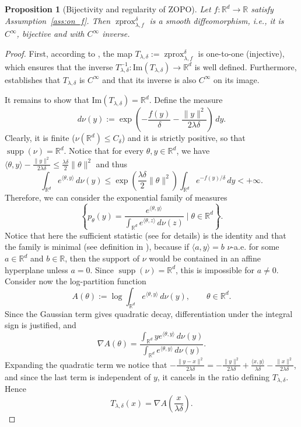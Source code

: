 \documentclass{article}
\newtheorem{proposition}{Proposition}
\newcommand{\R}{\mathbb{R}}
\newcommand{\zprox}{\ensuremath{\operatorname{zprox}}}
\begin{document}
\begin{proposition}[Bijectivity and regularity of ZOPO]\label{prop:zopo_surjective}
Let \(f:\mathbb{R}^d\to\mathbb{R}\) satisfy Assumption~\ref{ass:on_f}. Then $\zprox^{\delta}_{\lambda, f}$ is a smooth diffeomorphism, i.e., it is $C^\infty$, bijective and with $C^\infty$ inverse.
\end{proposition}
\begin{proof}  First, according to \cite[Corollary 1 (1)]{Gribonval2013}, the map $T_{\lambda,\delta}:= \operatorname{zprox}_{\lambda,f}^\delta$ is one-to-one (injective), which ensures that the inverse $T_{\lambda,\delta}^{-1}: \mathrm{Im}(T_{\lambda,\delta}) \to \mathbb{R}^d$ is well defined. Furthermore, \cite[Corollary 1 (2)]{Gribonval2013} establishes that $T_{\lambda,\delta}$ is $C^\infty$ and that its inverse is also $C^\infty$ on its image. 

It remains to show that $\mathrm{Im}(T_{\lambda,\delta})= \R^d$. Define the measure
\[
    d\nu(y)
    :=
    \exp\left(
        -\frac{f(y)}{\delta}
        -
        \frac{\|y\|^2}{2\lambda\delta}
    \right)\,dy.
\]
Clearly, it is finite ($\nu(\mathbb{R}^d)\leq C_\delta$) and it is strictly positive, so that $\operatorname{supp}(\nu)=\mathbb{R}^d$. Notice that for every
\(\theta,y\in\mathbb{R}^d\), we have $\langle \theta,y\rangle-\frac{\|y\|^2}{2\lambda\delta}\leq\frac{\lambda\delta}{2}\|\theta\|^2 $ and thus
\[
    \int_{\mathbb{R}^d}
    e^{\langle \theta,y\rangle}\,d\nu(y)
    \leq
    \exp\left(\frac{\lambda\delta}{2}\|\theta\|^2\right)
    \int_{\mathbb{R}^d} e^{-f(y)/\delta}\,dy
    <+\infty .
\]
Therefore, we can consider the exponential family of measures \cite[Equation (3.5)]{WainwrightJordan2008} \[\left\{p_\theta(y) = \frac{e^{\langle\theta,y\rangle}}{\int_{\mathbb{R}^d}
    e^{\langle \theta,z\rangle}\,d\nu(z)} \mid \theta \in \R^d\right\}.\] 
    Notice that here the sufficient statistic (see \cite[Section 3.2]{WainwrightJordan2008} for details) is the identity and that the family is minimal (see definition in \cite[Section 3.2]{WainwrightJordan2008}), because if $\langle a,y\rangle=b$ $\nu$-a.e. for some \(a\in\mathbb{R}^d\) and \(b\in\mathbb{R}\), then the support of \(\nu\) would be contained in an affine hyperplane unless \(a=0\). Since \(\operatorname{supp}(\nu)=\mathbb{R}^d\), this is impossible for \(a\neq0\). Consider now the log-partition function \cite[Equation (3.6)]{WainwrightJordan2008}
\[
    A(\theta)
    :=
    \log
    \int_{\mathbb{R}^d}
    e^{\langle \theta,y\rangle}\,d\nu(y),
    \qquad \theta\in\mathbb{R}^d .
\]
Since the Gaussian term gives quadratic decay, differentiation under the integral sign is justified,
and
\[
    \nabla A(\theta)
    =
    \frac{
    \displaystyle\int_{\mathbb{R}^d}
    y e^{\langle\theta,y\rangle}\,d\nu(y)
    }{
    \displaystyle\int_{\mathbb{R}^d}
    e^{\langle\theta,y\rangle}\,d\nu(y)
    }.
\]
Expanding the quadratic term we notice that $-\frac{\|y-x\|^2}{2\lambda\delta}= -\frac{\|y\|^2}{2\lambda\delta}+\frac{\langle x,y\rangle}{\lambda\delta}-\frac{\|x\|^2}{2\lambda\delta}$, and since the last term is independent of \(y\), it cancels in the ratio defining \(T_{\lambda,\delta}\). Hence
\[
    T_{\lambda,\delta}(x)
    =
    \nabla A\left(\frac{x}{\lambda\delta}\right).
\]



\end{proof}
\end{document}
